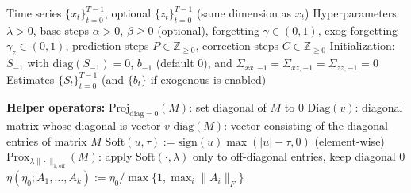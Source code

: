 %
%
%

\begin{algorithm}[t]
\caption{Prediction--Correction (PC) for SEM with exogenous inputs (implementation-matched)}
\label{alg:pc-sem-exog}
\begin{algorithmic}[1]
\Require Time series $\{x_t\}_{t=0}^{T-1}$, optional $\{z_t\}_{t=0}^{T-1}$ (same dimension as $x_t$)
\Require Hyperparameters: $\lambda>0$, base steps $\alpha>0$, $\beta\ge 0$ (optional), forgetting $\gamma\in(0,1)$, exog-forgetting $\gamma_z\in(0,1)$, prediction steps $P\in\mathbb{Z}_{\ge0}$, correction steps $C\in\mathbb{Z}_{\ge0}$
\Require Initialization: $S_{-1}$ with $\mathrm{diag}(S_{-1})=0$, $b_{-1}$ (default $0$), and $\Sigma_{xx,-1}=\Sigma_{xz,-1}=\Sigma_{zz,-1}=0$
\Ensure Estimates $\{S_t\}_{t=0}^{T-1}$ (and $\{b_t\}$ if exogenous is enabled)

\State \textbf{Helper operators:}
\Statex \hspace{1em} $\mathrm{Proj}_{\mathrm{diag}=0}(M)$: set diagonal of $M$ to $0$
\Statex \hspace{1em} $\mathrm{Diag}(v)$: diagonal matrix whose diagonal is vector $v$
\Statex \hspace{1em} $\mathrm{diag}(M)$: vector consisting of the diagonal entries of matrix $M$
\Statex \hspace{1em} $\mathrm{Soft}(u,\tau) := \mathrm{sign}(u)\max(|u|-\tau,0)$ (element-wise)
\Statex \hspace{1em} $\mathrm{Prox}_{\lambda\|\cdot\|_{1,\mathrm{off}}}(M)$: apply $\mathrm{Soft}(\cdot,\lambda)$ only to off-diagonal entries, keep diagonal $0$
\Statex \hspace{1em} $\eta(\eta_0;A_1,\dots,A_k) := \eta_0 / \max\{1,\max_i \|A_i\|_F\}$  


\end{algorithmic}
\end{algorithm}
